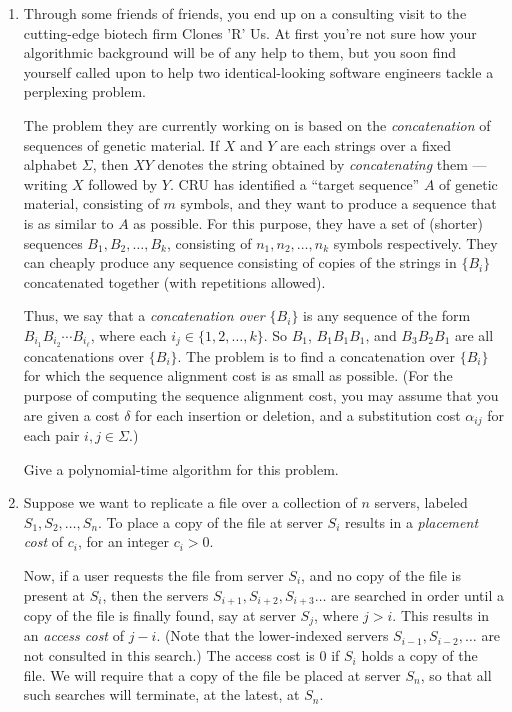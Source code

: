 \documentclass[12pt]{article}
\begin{document}
\begin{enumerate}

\item

Through some friends of friends, you end up
on a consulting visit to the cutting-edge
biotech firm Clones 'R' Us.
At first you're not sure how your algorithmic background
will be of any help to them, but you soon find yourself
called upon to help two identical-looking software engineers
tackle a perplexing problem.

The problem they are currently working on is based on
the {\em concatenation} of sequences of genetic material.
If $X$ and $Y$ are each strings over a fixed alphabet $\Sigma$,
then $XY$ denotes the string obtained by {\em concatenating} them ---
writing $X$ followed by $Y$.
CRU has identified a ``target sequence''
$A$ of genetic material, consisting of $m$ symbols,
and they want to produce a sequence that is as similar to $A$ as possible.
For this purpose, they have a set of (shorter) sequences
$B_1, B_2, \ldots, B_k$, consisting of $n_1, n_2, \ldots, n_k$
symbols respectively.
They can cheaply produce any sequence consisting of copies
of the strings in $\{B_i\}$ concatenated together (with repetitions allowed).

Thus, we say that a {\em concatenation over $\{B_i\}$} is any
sequence of the form $B_{i_1} B_{i_2} \cdots B_{i_\ell}$,
where each $i_j \in \{1, 2, \ldots, k\}$.
So $B_1$, $B_1 B_1 B_1$, and $B_3 B_2 B_1$ are all
concatenations over $\{B_i\}$.
The problem is to find a concatenation over $\{B_i\}$
for which the sequence alignment cost is as small as possible.
(For the purpose of computing the sequence alignment cost, you may
assume that you are given a cost $\delta$ for each insertion
or deletion, and a substitution cost $\alpha_{ij}$
for each pair $i, j \in \Sigma$.)

Give a polynomial-time algorithm for this problem.


\item

Suppose we want to replicate a file over a collection of
$n$ servers, labeled $S_1, S_2, \ldots, S_n$.  To place a copy
of the file at server $S_i$ results in a {\em placement cost} of $c_i$,
for an integer $c_i > 0$.

Now, if a user requests the file from server $S_i$, and no
copy of the file is present at $S_i$, then the servers $S_{i+1},
S_{i+2}, S_{i+3} \ldots$ are searched in order until a copy of the file
is finally found, say at server $S_j$, where $j > i$.
This results in an {\em access cost} of $j - i$.
(Note that the lower-indexed servers $S_{i-1}, S_{i-2}, \ldots$
are not consulted in this search.)
The access cost is $0$ if $S_i$ holds a copy of the file.
We will require that a copy of the file be placed at server $S_n$,
so that all such searches will terminate, at the latest, at $S_n$.


\end{enumerate}
\end{document}
